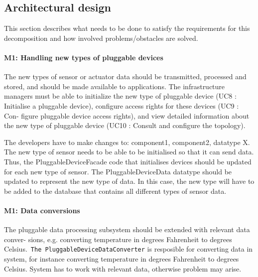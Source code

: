 \subsection{Architectural design}
    This section describes what needs to be done to satisfy the requirements for
    this decomposition and how involved problems/obstacles are solved.


    \paragraph{M1: Handling new types of pluggable devices}
        The new types of sensor or actuator data should be transmitted, processed and stored,
        and should be made available to applications. The infrastructure managers must be able to initialize the new type of pluggable device
        (UC8 : Initialise a pluggable device), configure access rights for these devices (UC9 : Con-
        figure pluggable device access rights), and view detailed information about the new type
        of pluggable device (UC10 : Consult and configure the topology).

        The developers have to make changes to: component1, component2, datatype X.
        The new type of sensor needs to be able to be initialised so that it can send data.
        Thus, the PluggableDeviceFacade code that initialises devices should be updated for
        each new type of sensor. The PluggableDeviceData datatype should be updated to
        represent the new type of data. In this case, the new type will have to be added
        to the database that contains all different types of sensor data.

    \paragraph{M1: Data conversions}
        The pluggable data processing subsystem should be extended with relevant data conver-
        sions, e.g. converting temperature in degrees Fahrenheit to degrees Celsius.\
        \texttt{The PluggableDeviceDataConverter} is resposible for converting data
         in system, for instance converting temperature in degrees Fahrenheit
         to degrees Celsius. System has to work with relevant data,
         otherwise problem may arise.

